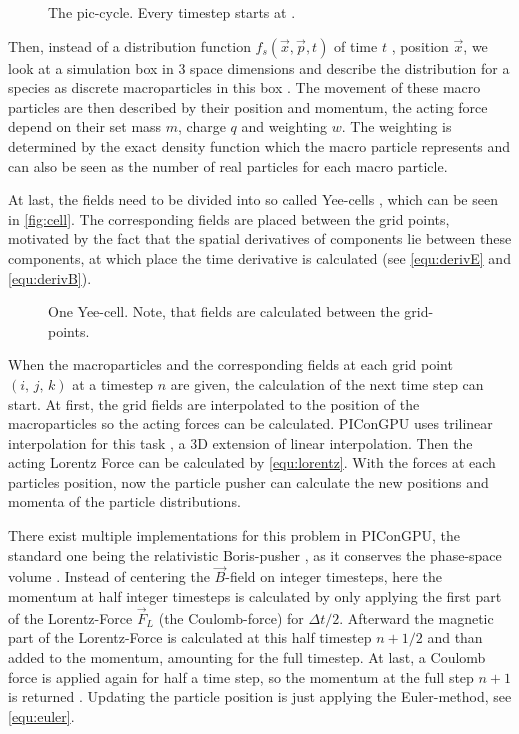 \documentclass[bachelor_thesis]{subfiles}
\begin{document}
\begin{figure}
	\centering
	\missingfigure{}
	\caption{The \gls{pic}-cycle. Every timestep starts at .}
	\label{fig:cycle}
\end{figure}

Then, instead of a distribution function $f_s(\vec{x}, \vec{p}, t)$ of time $t$ , position $\vec{x}$, we look at a simulation box in 3 space dimensions and describe the distribution for a species as discrete macroparticles in this box \cite{Burau2010}.
The movement of these macro particles are then described by their position and momentum, the acting force depend on their set mass $m$, charge $q$ and weighting $w$.
The weighting is determined by the exact density function which the macro particle represents and can also be seen as the number of real particles for each macro particle.


At last, the fields need to be divided into so called Yee-cells \cite{Yee1966}, which can be seen in \autoref{fig:cell}. The corresponding fields are placed between the grid points, motivated by the fact that the spatial derivatives of components lie between these components, 
at which place the time derivative is calculated (see \autoref{equ:derivE} and \autoref{equ:derivB}).

\begin{figure}
	\centering
	\missingfigure{}
	\caption{One Yee-cell. Note, that fields are calculated between the grid-points.}
	\label{fig:cell}
\end{figure}

When the macroparticles and the corresponding fields at each grid point $(i, \, j, \,k)$ at a timestep $n$ are given, the calculation of the next time step can start.
At first, the grid fields are interpolated to the position of the macroparticles so the acting forces can be calculated. PIConGPU uses trilinear interpolation for this task \cite{Huebl2019, PICRepo}, a 3D extension of linear interpolation.
Then the acting Lorentz Force can be calculated by \autoref{equ:lorentz}. With the forces at each particles position, now the particle pusher can calculate the new positions and momenta of the particle distributions.

There exist multiple implementations for this problem in PIConGPU, the standard one being the relativistic Boris-pusher \cite{Boris1970}, as it conserves the phase-space volume \cite{PICRepo}. Instead of centering the $\vec{B}$-field on integer timesteps, here the momentum at half integer timesteps is
calculated by only applying the first part of the Lorentz-Force $\vec{F}_L$ (the Coulomb-force) for $\Delta t/2$. Afterward the magnetic part of the Lorentz-Force is calculated at this half timestep $n+1/2$ and than added to the momentum, amounting for the full timestep.
At last, a Coulomb force is applied again for half a time step, so the momentum at the full step $n+1$ is returned \cite{Zenitani2018, Pausch2019}. Updating the particle position is just applying the Euler-method, see \autoref{equ:euler}.
\end{document}
